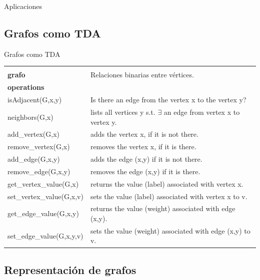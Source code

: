 \documentclass{beamer} %
\begin{document}
\begin{frame}{Aplicaciones}
\begin{minipage}{0.4\textwidth}
    \end{minipage}
\end{frame}

\subsection{Grafos como TDA}

\begin{frame}{Grafos como TDA}
    \scriptsize{
    \begin{tabular}{lp{60ex}}\hline\\[-1ex]
      {\bf\normalsize grafo} & Relaciones binarias entre vértices.\\[2ex]
      {\bf\small operations}  & \\[1.5ex]
      isAdjacent(G,x,y) & Is there an edge from the vertex x to the vertex y?\\
      neighbors(G,x)    & lists all vertices y s.t. $\exists$ an edge from vertex x to vertex y.\\
      add\_vertex(G,x)   & adds the vertex x, if it is not there.\\
      remove\_vertex(G,x)& removes the vertex x, if it is there.\\
      add\_edge(G,x,y)   & adds the edge (x,y) if it is not there.\\
      remove\_edge(G,x,y)& removes the edge (x,y) if it is there.\\[1.5ex]
      get\_vertex\_value(G,x) & returns the value (label) associated with vertex x.\\
      set\_vertex\_value(G,x,v) & sets the value (label) associated with vertex x to v.\\[1.5ex]
      get\_edge\_value(G,x,y) & returns the value (weight) associated with edge (x,y).\\
      set\_edge\_value(G,x,y,v) & sets the value (weight) associated with edge (x,y) to v.\\[1.5ex]\hline
    \end{tabular}}
\end{frame}

\subsection{Representación de grafos}
\end{document}
